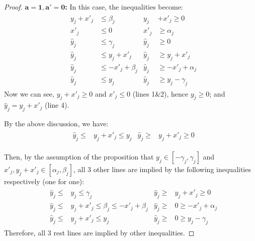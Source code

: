\begin{proof}[Proof]
 
\textbf{$\mathbf{a = 1, a' = 0}$:} In this case, the inequalities become: \begin{align*}
	& \begin{aligned}
		y_j + x'_j &\leq \beta_j        &
		y_j &+ x'_j \geq 0 \\
		x'_j       &\leq 0       & 
		x'_j       &\geq \alpha_j \\
		\hat{y}_j  &\leq \gamma_j       &
		\hat{y}_j  &\geq 0 \\
		\hat{y}_j  &\leq y_j + x'_j &
		\hat{y}_j  &\geq y_j + x'_j  \\
		\hat{y}_j  &\leq -x'_j + \beta_j &
		\hat{y}_j  &\geq -x'_j + \alpha_j \\
		\hat{y}_j  &\leq y_j  &
		\hat{y}_j  &\geq y_j - \gamma_j
	\end{aligned}
\end{align*} Now we can see, $y_j+x'_j\geq 0$ and $x'_j \leq 0$ (lines 1\&2), hence $y_j \geq 0$; and $\hat{y}_j= y_j + x'_j$ (line 4). 

By the above discussion,  we have: \begin{align*}
	& \begin{aligned}
		\hat{y}_j  \leq& y_j+x'_j \leq y_j  &\hat{y}_j  \geq& y_j+x'_j \geq 0
	\end{aligned}
\end{align*}

Then, by the assumption of the proposition that $y_j \in [-\gamma_j, \gamma_j]$ and $x'_j,y_j+x'_j \in [\alpha_j,\beta_j]$, all 3 other lines are implied by the following inequalities respectively (one for one): \begin{align*}
	& \begin{aligned}
		\hat{y}_j  \leq&  y_j \leq \gamma_j       &
		\hat{y}_j  \geq& y_j+x'_j \geq 0 \\
		\hat{y}_j  \leq&  y_j+x'_j\leq\beta_j \leq -x'_j + \beta_j &
		\hat{y}_j  \geq& 0 \geq -x'_j + \alpha_j \\
		\hat{y}_j  \leq& y_j+x'_j \leq y_j  &
		\hat{y}_j  \geq& 0 \geq y_j - \gamma_j
	\end{aligned}
\end{align*}Therefore, all 3 rest lines are implied by other inequalities.
	


\end{proof}

